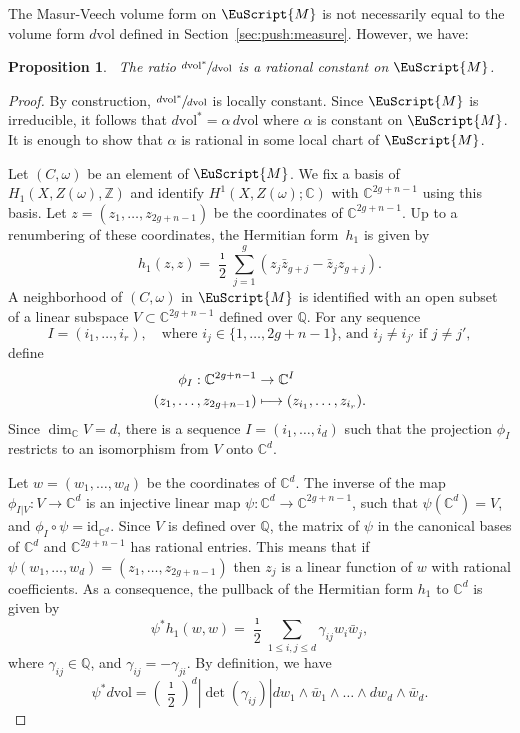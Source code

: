 \documentclass[10pt]{amsart}
\let\mathcal\EuScript
\newcommand\mto{\mathchoice{\longmapsto}{\mapsto}{\mapsto}{\mapsto}}
\theoremstyle{plain}
\newtheorem{Proposition}[Theorem]{Proposition}
\theoremstyle{definition}
\def\C{\mathbb{C}}
\newcommand\Z{\mathbb{Z}}
\newcommand{\Q}{\mathbb{Q}}
\newcommand{\cM}{\mathcal{M}}
\newcommand{\id}{\mathrm{id}}
\newcommand{\vol}{\mathrm{vol}}
\begin{document}
The Masur-Veech volume form on $\cM$ is not necessarily equal to the volume form $d\vol$ defined in Section~\ref{sec:push:measure}. However, we have:

\begin{Proposition}~\label{prop:compare:meas:arith}
The ratio $\sfrac{d\vol^*}{d\vol}$ is a rational constant on $\cM$.
\end{Proposition}

\begin{proof}
By construction, $\sfrac{d\vol^*}{d\vol}$ is locally constant. Since $\cM$ is irreducible, it follows that $d\vol^*=\alpha\, d\vol$ where $\alpha$ is constant on $\cM$. It is enough to show that $\alpha$ is rational in some local chart of $\cM$.

Let $(C,\omega)$ be an element of $\cM$. We fix a basis of $H_1(X,Z(\omega),\Z)$ and identify $H^1(X,Z(\omega);\C)$ with $\C^{2g+n-1}$ using this basis.
Let $z=(z_1,\dots, z_{2g+n-1})$ be the coordinates of $\C^{2g+n-1}$.
Up to a renumbering of these coordinates, the Hermitian form~$h_1$ is given by
\[
h_1(z,z)=\frac{\imath}{2}\sum_{j=1}^g(z_j\bar{z}_{g+j}-\bar{z}_jz_{g+j}).
\]
A neighborhood of $(C,\omega)$ in $\cM$ is identified with an open subset of a linear subspace $V\subset \C^{2g+n-1}$ defined over $\Q$.
For any sequence
\[
I=(i_1,\dots,i_r),\quad\text{where $i_j\in \{1,\dots,2g+n-1\}$, and $i_j\neq i_{j'}$ if $j\neq j'$},
\]
define
\begin{align*}
\phi_I: \C^{2g+n-1} & \to \C^{I}\\
(z_1,\dots,z_{2g+n-1}) & \mto (z_{i_1},\dots,z_{i_r}).
\end{align*}
Since $\dim_\C V=d$, there is a sequence $I=(i_1,\dots,i_d)$ such that the projection $\phi_I$ restricts to an isomorphism from $V$ onto $\C^{d}$.

Let $w=(w_1,\dots,w_d)$ be the coordinates of $\C^d$. The inverse of the map \hbox{$\phi_{I|V}: V \to \C^d$} is an injective linear map $\psi: \C^d \to \C^{2g+n-1}$, such that $\psi(\C^d)=V$, and $\phi_I\circ\psi =\id_{\C^d}$. Since $V$ is defined over $\Q$, the matrix of $\psi$ in the canonical bases of $\C^d$ and $\C^{2g+n-1}$ has rational entries. This means that if $\psi(w_1,\dots,w_d)=(z_1,\dots,z_{2g+n-1})$ then $z_j$ is a linear function of $w$ with rational coefficients.
As a consequence, the pullback of the Hermitian form $h_1$ to $\C^{d}$ is given by
\[
\psi^*h_1(w,w)=\frac{\imath}{2}\sum_{1\leq i,j\leq d}\gamma_{ij}w_i\bar{w}_j,
\]
where $\gamma_{ij}\in \Q$, and $\gamma_{ij}=-\gamma_{ji}$.
By definition, we have
\[
\psi^*d\vol=\left(\frac{\imath}{2}\right)^d\left|{\det}(\gamma_{ij})\right|dw_1\wedge\bar{w}_1\wedge\dots\wedge dw_d\wedge\bar{w}_d.
\]


\end{proof}
\end{document}
